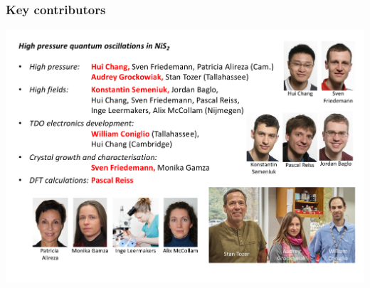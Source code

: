 \begin{frame}[plain,label=Conc]
\frametitle {Key contributors}
\includegraphics[width=1.25\textwidth]{GroupListNiS2}








\end{frame}
